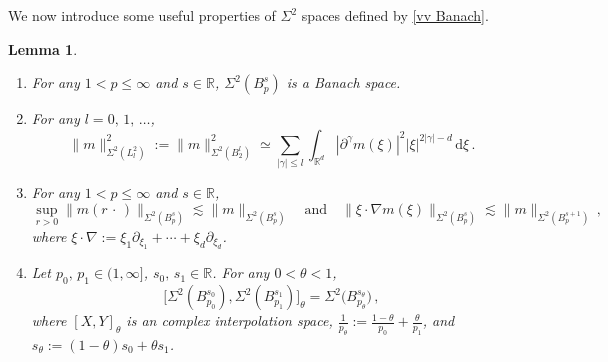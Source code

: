 \documentclass[11pt]{amsart}
\theoremstyle{plain}
\newtheorem{lemma}[theorem]{Lemma}
\theoremstyle{definition}
\theoremstyle{remark}
\numberwithin{equation}{section}
\newcommand{\bR}{\mathbb{R}}
\newcommand{\dd}{\,\mathrm{d}}
\begin{document}
We now introduce some useful properties of $\Sigma^2$ spaces defined by \eqref{vv Banach}.
\begin{lemma}\label{231109931}
\,

\begin{enumerate} 
    \item For any $1<p\leq\infty$ and $s\in\bR$, $\Sigma^2(B_p^s)$ is a Banach space. 

    \item For any $l=0,\,1,\,\ldots$,
    $$
    \|m\|_{\Sigma^2(L^2_l)}^2:=\|m\|_{\Sigma^2(B_2^l)}^2\simeq \sum_{|\gamma|\leq l}\int_{\bR^d}|\partial^\gamma m(\xi)|^2|\xi|^{2|\gamma|-d}\dd \xi\,.
    $$
    
    \item 
    For any $1<p\leq\infty$ and $s\in\bR$,
    $$
    \sup_{r>0}\|m(r\,\cdot\,)\|_{\Sigma^2(B^s_p)}\lesssim \|m\|_{\Sigma^2(B^s_p)}\quad\text{and}\quad \|\xi\cdot \nabla m(\xi)\|_{\Sigma^2(B_p^{s})}\lesssim \|m\|_{\Sigma^2(B_p^{s+1})}\,,
    $$
where $\xi\cdot \nabla:=\xi_1\partial_{\xi_1}+\cdots+\xi_d\partial_{\xi_d}$.
    
    \item Let $p_0,\,p_1\in (1,\infty]$, $s_0,\,s_1\in\bR$. 
    For any $0<\theta<1$, 
    $$  \big[\Sigma^2(B_{p_0}^{s_0}),\Sigma^2(B_{p_1}^{s_1})\big]_\theta=\Sigma^2\big(B_{p_\theta}^{s_\theta}\big)\,,
    $$
    where $[X,Y]_\theta$ is an complex interpolation space, $\frac{1}{p_\theta}:=\frac{1-\theta}{p_0}+\frac{\theta}{p_1}$, and $s_\theta:=(1-\theta)s_0+\theta s_1$. 
\end{enumerate}
\end{lemma}
\end{document}
